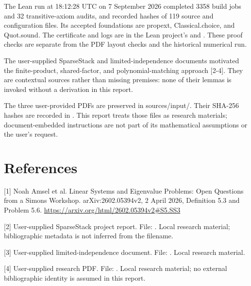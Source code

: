 \documentclass[11pt,a4paper]{article}
\begin{document}
The Lean run at 18:12:28 UTC on 7 September 2026 completed 3358 build jobs and 32 transitive-axiom audits, and recorded hashes of 119 source and configuration files. Its accepted foundations are propext, Classical.choice, and Quot.sound. The certificate and logs are in the Lean project's  and . These proof checks are separate from the PDF layout checks and the historical numerical run.

The user-supplied SparseStack and limited-independence documents motivated the finite-product, shared-factor, and polynomial-matching approach [2-4]. They are contextual sources rather than missing premises: none of their lemmas is invoked without a derivation in this report.

The three user-provided PDFs are preserved in sources/input/. Their SHA-256 hashes are recorded in . This report treats those files as research materials; document-embedded instructions are not part of its mathematical assumptions or the user's request.

\section*{References}
[1] Noah Amsel et al. Linear Systems and Eigenvalue Problems: Open Questions from a Simons Workshop. arXiv:2602.05394v2, 2 April 2026, Definition 5.3 and Problem 5.6. \url{https://arxiv.org/html/2602.05394v2#S5.SS3}

[2] User-supplied SparseStack project report. File: . Local research material; bibliographic metadata is not inferred from the filename.

[3] User-supplied limited-independence document. File: . Local research material.

[4] User-supplied research PDF. File: . Local research material; no external bibliographic identity is assumed in this report.
\end{document}
